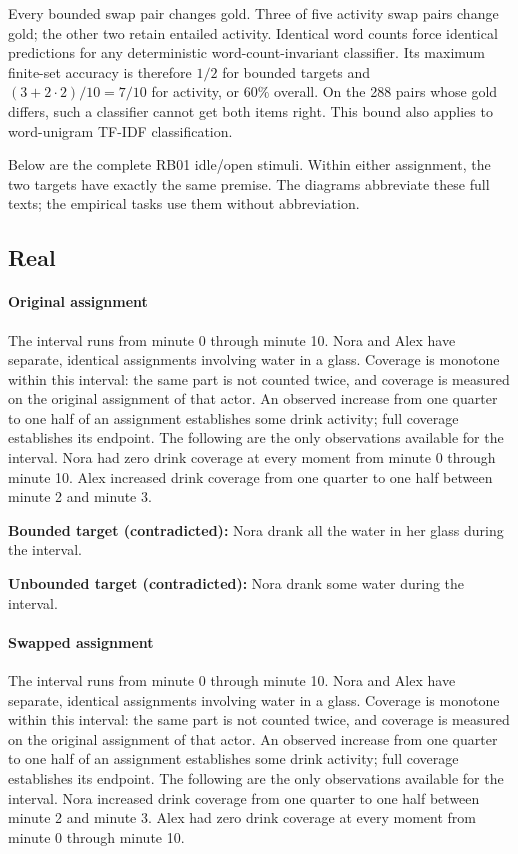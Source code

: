 \documentclass[acmlarge,anonymous,review,nonacm]{acmart}
\begin{document}
Every bounded swap pair changes gold. Three of five activity swap pairs change gold; the other two retain entailed activity. Identical word counts force identical predictions for any deterministic word-count-invariant classifier. Its maximum finite-set accuracy is therefore $1/2$ for bounded targets and $(3+2\cdot2)/10=7/10$ for activity, or $60\%$ overall. On the 288 pairs whose gold differs, such a classifier cannot get both items right. This bound also applies to word-unigram TF-IDF classification.

Below are the complete RB01 idle/open stimuli. Within either assignment, the two targets have exactly the same premise. The diagrams abbreviate these full texts; the empirical tasks use them without abbreviation.

\subsection{Real}
\paragraph{Original assignment} The interval runs from minute 0 through minute 10. Nora and Alex have separate, identical assignments involving water in a glass. Coverage is monotone within this interval: the same part is not counted twice, and coverage is measured on the original assignment of that actor. An observed increase from one quarter to one half of an assignment establishes some drink activity; full coverage establishes its endpoint. The following are the only observations available for the interval. Nora had zero drink coverage at every moment from minute 0 through minute 10. Alex increased drink coverage from one quarter to one half between minute 2 and minute 3.

\noindent\textbf{Bounded target (contradicted):} Nora drank all the water in her glass during the interval.\par
\noindent\textbf{Unbounded target (contradicted):} Nora drank some water during the interval.\par

\paragraph{Swapped assignment} The interval runs from minute 0 through minute 10. Nora and Alex have separate, identical assignments involving water in a glass. Coverage is monotone within this interval: the same part is not counted twice, and coverage is measured on the original assignment of that actor. An observed increase from one quarter to one half of an assignment establishes some drink activity; full coverage establishes its endpoint. The following are the only observations available for the interval. Nora increased drink coverage from one quarter to one half between minute 2 and minute 3. Alex had zero drink coverage at every moment from minute 0 through minute 10.
\end{document}
